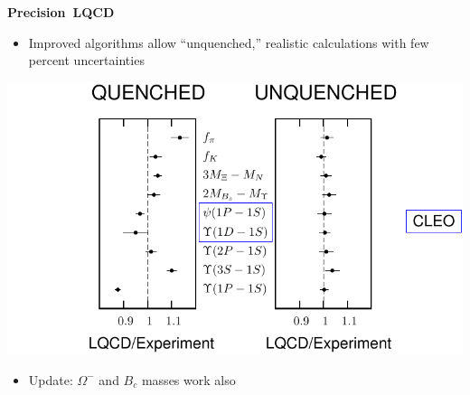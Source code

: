 \documentclass[landscape]{article}
\newenvironment{slide}[1][ ]{\mbox{\bf \boldmath #1 } \vfill}{\vfill \vspace{-1.5 cm} \mbox{ } \pagebreak}
\begin{document}
\begin{slide}[Precision LQCD]

\begin{itemize}

  \item Improved algorithms allow ``unquenched,'' realistic
    calculations with few percent uncertainties

\end{itemize}

\vspace{0.5 cm}
\begin{center}
  \includegraphics[width=0.9\linewidth, trim=0 0.5cm 0 0.4cm]{lqcd_success2}
\end{center}

\vspace{0.5 cm}
\begin{itemize}

  \item Update: $\Omega^-$ and $B_c$ masses work also

\end{itemize}

\end{slide}
\end{document}

